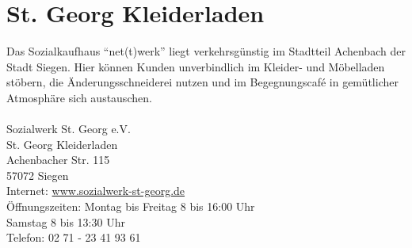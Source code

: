 \section{St. Georg Kleiderladen}
Das Sozialkaufhaus \enquote{net(t)werk} liegt verkehrsgünstig im Stadtteil Achenbach der Stadt Siegen. Hier können Kunden unverbindlich im Kleider- und Möbelladen stöbern, die Änderungsschneiderei nutzen und im Begegnungscafé in gemütlicher Atmosphäre sich austauschen.\\
\\
Sozialwerk St. Georg e.V. \\
St. Georg Kleiderladen \\
Achenbacher Str. 115 \\
57072 Siegen \\
Internet: \href{http://www.sozialwerk-st-georg.de}{www.sozialwerk-st-georg.de}
\\
Öffnungszeiten: Montag bis Freitag 8 bis 16:00 Uhr\\
Samstag 8 bis 13:30 Uhr \\
Telefon: 02 71 - 23 41 93 61